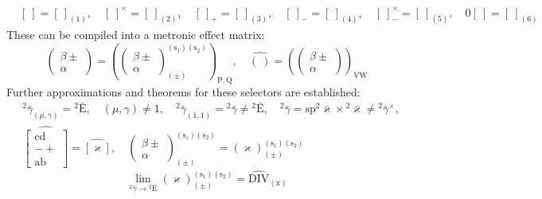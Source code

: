 \documentclass[12pt]{article}
\begin{document}
\begin{itemize}
\begin{equation}
\begin{aligned}
    & [\ ] = [\ ]_{(1)}, \quad [\ ]^\times = [\ ]_{(2)}, \quad [\ ]_+ = [\ ]_{(3)}, \quad [\ ]_- = [\ ]_{(4)}, \quad [\ ]^\times_- = [\ ]_{(5)}, \quad 0[\ ] = [\ ]_{(6)}
    \end{aligned} \tag{95}
    \end{equation}
    These can be compiled into a metronic effect matrix:
    \begin{equation}
    \left( \begin{matrix} \beta \pm \\ \alpha \end{matrix} \right) = \left( \left( \begin{matrix} \beta \pm \\ \alpha \end{matrix} \right)^{(\mathrm{s_1})(\mathrm{s_2})}_{(\pm)} \right)_{\mathrm{P,Q}}, \quad \widehat{(\ )} = \left( \left( \begin{matrix} \beta \pm \\ \alpha \end{matrix} \right) \right)_{\mathrm{VW}} \tag{95a}
    \end{equation}
    Further approximations and theorems for these selectors are established:
    \begin{equation}
    \begin{aligned}
    & {}^2\bar{\gamma}_{(\mu,\gamma)} = {}^2\bar{\mathrm{E}}, \quad (\mu,\gamma) \neq 1, \quad {}^2\bar{\gamma}_{(1,1)} = {}^2\bar{\gamma} \neq {}^2\bar{\mathrm{E}}, \quad {}^2\bar{\gamma} = \mathrm{sp} {}^2\bar{\varkappa} \times {}^2\bar{\varkappa} \neq {}^2\bar{\gamma}^\times, \\
    & \widehat{\left[ \begin{matrix} \mathrm{cd} \\ - + \\ \mathrm{ab} \end{matrix} \right]} = \widehat{[\varkappa]}, \quad \left( \begin{matrix} \beta \pm \\ \alpha \end{matrix} \right)^{(\mathrm{s_1})(\mathrm{s_2})}_{(\pm)} = (\varkappa)^{(\mathrm{s_1})(\mathrm{s_2})}_{(\pm)}
    \end{aligned} \tag{96}
    \end{equation}
    \begin{equation}
    \lim_{{}^2\bar{\gamma} \to {}^2\bar{\mathrm{E}}} (\varkappa)^{(\mathrm{s_1})(\mathrm{s_2})}_{(\pm)} = \widehat{\mathrm{DIV}}_{(\mathrm{x})} \tag{96a}
    \end{equation}

\end{itemize}
\end{document}
